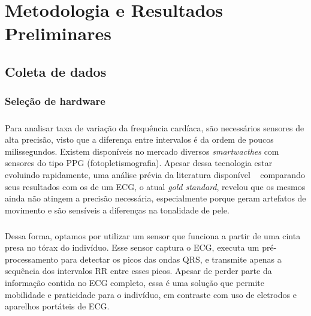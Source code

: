 \chapter{Metodologia e Resultados Preliminares}
\label{methods}



    \section{Coleta de dados}
    \label{collect}

        \subsection{Seleção de hardware}
        \label{hardware}
    
            \paragraph{}
            Para analisar taxa de variação da frequência cardíaca, são necessários sensores de alta precisão, visto que a diferença entre intervalos é da ordem de poucos milissegundos. Existem disponíveis no mercado diversos \textit{smartwacthes} com sensores do tipo PPG (fotopletismografia). Apesar dessa tecnologia estar evoluindo rapidamente, uma análise prévia da literatura disponível ~\cite{Parak2014EvaluationPhotopletysmography, Schafer2013HowElectrocardiogram.} comparando seus resultados com os de um ECG, o atual \textit{gold standard},  revelou que os mesmos ainda não atingem a precisão necessária, especialmente porque geram artefatos de movimento e são sensíveis a diferenças na tonalidade de pele.
            
            \paragraph{}
            Dessa forma, optamos por utilizar um sensor que funciona a partir de uma cinta presa no tórax do indivíduo. Esse sensor captura o ECG, executa um pré-processamento para detectar os picos das ondas QRS, e transmite apenas a sequência dos intervalos RR entre esses picos. Apesar de perder parte da informação contida no ECG completo, essa é uma solução que permite mobilidade e praticidade para o indivíduo, em contraste com uso de eletrodos e aparelhos portáteis de ECG.
            
